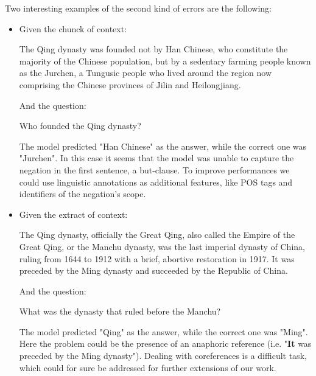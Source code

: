     Two interesting examples of the second kind of errors are the following:

    \begin{itemize}
        \item 
            Given the chunck of context:
            \begin{center}
                The Qing dynasty was founded not by Han Chinese, who constitute the majority of the Chinese population, 
                but by a sedentary farming people known as the Jurchen, a Tungusic people who lived around the region now 
                comprising the Chinese provinces of Jilin and Heilongjiang. 
            \end{center}

            And the question: 
            \begin{center}
                Who founded the Qing dynasty?
            \end{center}

            The model predicted "Han Chinese" as the answer, while the correct one was "Jurchen". In this case it seems that 
            the model was unable to capture the negation in the first sentence, a but-clause. To improve performances 
            we could use linguistic annotations as additional features, like POS tags and identifiers of the negation's scope.
            
        
        \item
            Given the extract of context:
            \begin{center}
                The Qing dynasty, officially the Great Qing, also called the Empire of the Great Qing, or the Manchu dynasty, 
                was the last imperial dynasty of China, ruling from 1644 to 1912 with a brief, abortive restoration in 1917. 
                It was preceded by the Ming dynasty and succeeded by the Republic of China. 
            \end{center}

            And the question:
            \begin{center}
                What was the dynasty that ruled before the Manchu?
            \end{center}

            The model predicted "Qing" as the answer, while the correct one was "Ming". Here the problem could be the presence of an 
            anaphoric reference (i.e. "\textbf{It} was preceded by the Ming dynasty"). Dealing with coreferences is a difficult task, 
            which could for sure be addressed for further extensions of our work.

    \end{itemize}